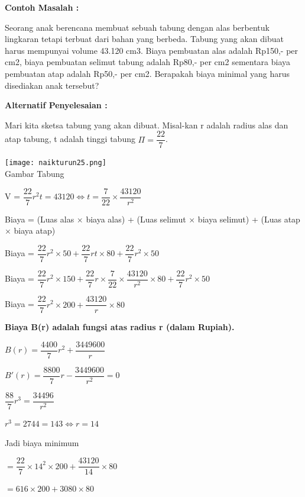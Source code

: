 \documentclass[11pt,fleqn]{book} %
\begin{document}
\begin{flushleft}
\textbf{Contoh Masalah :}
\end{flushleft}

Seorang anak berencana membuat sebuah tabung
dengan alas berbentuk lingkaran tetapi terbuat dari
bahan yang berbeda. Tabung yang akan dibuat harus
mempunyai volume 43.120 cm3. Biaya pembuatan
alas adalah Rp150,- per cm2, biaya pembuatan
selimut tabung adalah Rp80,- per cm2 sementara
biaya pembuatan atap adalah Rp50,- per cm2.
Berapakah biaya minimal yang harus disediakan
anak tersebut?

\begin{flushleft}
\textbf{Alternatif Penyelesaian :}
\end{flushleft}

Mari kita sketsa tabung yang akan dibuat. Misal-kan r
adalah radius alas dan atap tabung, t adalah tinggi tabung $\Pi = \dfrac{22}{7}$.

\begin{center}
\texttt{[image: naikturun25.png]}\\
Gambar Tabung
\end{center}

V = $\dfrac{22}{7}r^{2}t = 43120 \Leftrightarrow t = \dfrac{7}{22} \times \dfrac{43120}{r^{2}}$

Biaya = (Luas alas $\times$ biaya alas) + (Luas selimut $\times$ biaya selimut) + (Luas atap $\times$ biaya atap)

Biaya =
$\dfrac{22}{7}r^{2} \times 50 + \dfrac{22}{7}rt \times 80 + \dfrac{22}{7}r^{2} \times 50$

Biaya =
$\dfrac{22}{7}r^{2} \times 150 + \dfrac{22}{7}r \times \dfrac{7}{22} \times \dfrac{43120}{r^{2}} \times 80 + \dfrac{22}{7}r^{2} \times 50$

Biaya =
$\dfrac{22}{7}r^{2} \times 200 + \dfrac{43120}{r} \times 80$

\textbf{Biaya B(r) adalah fungsi atas radius r (dalam Rupiah).}

$B(r) = \dfrac{4400}{7}r^{2} + \dfrac{3449600}{r}$

$B'(r) = \dfrac{8800}{7}r - \dfrac{3449600}{r^{2}} = 0$

$\dfrac{88}{7}r^{3} = \dfrac{34496}{r^{2}}$

$r^{3} = 2744 = 143 \Leftrightarrow r = 14$

Jadi biaya minimum

$= \dfrac{22}{7} \times 14^{2} \times 200 + \dfrac{43120}{14} \times 80$

$= 616 \times 200 + 3080 \times 80$
\end{document}
